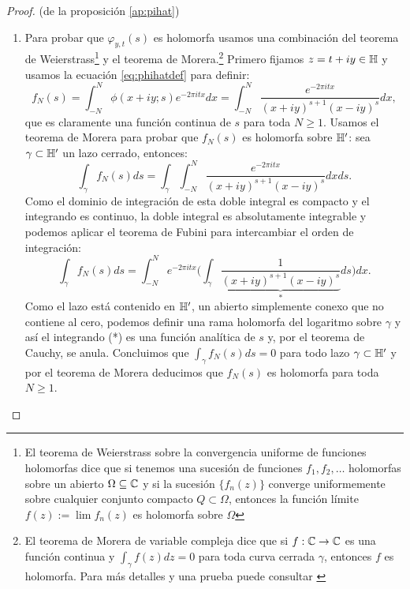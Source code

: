 \begin{proof}(de la proposici\'on \ref{ap:pihat})
\begin{enumerate}[label=\emph{\roman*})]
\item    
  Para probar que $\varphi_{y,t}(s)$ es holomorfa usamos una combinaci\'on del teorema de
  Weierstrass\footnote{El teorema de Weierstrass sobre la convergencia uniforme de funciones
    holomorfas dice que si tenemos una sucesi\'on de funciones $f_1,f_2,\ldots$ holomorfas sobre
    un abierto $\Omega\subseteq\mathbb{C}$ y si la sucesi\'on $\{f_n(z)\}$ converge uniformemente sobre
    cualquier conjunto compacto $Q\subset\Omega$, entonces la funci\'on l\'imite $f(z):=\lim f_n(z)$
    es holomorfa sobre $\Omega$} y el teorema de Morera.\footnote{
    El teorema de Morera de variable compleja dice que si $f:\mathbb{C}\rightarrow\mathbb{C}$ es una funci\'on continua
    y $\int_{\gamma}f(z)dz=0$ para toda curva cerrada $\gamma$, entonces $f$ es holomorfa. Para m\'as
    detalles y una prueba puede consultar \cite{AhlforsCA}}
  Primero fijamos $z=t+iy\in\mathbb{H}$ y usamos la ecuaci\'on \eqref{eq:phihatdef} para definir:
  \[
    f_N(s)=
    \int_{-N}^{N}\phi(x+iy;s)e^{-2\pi i tx}dx=
    \int_{-N}^{N}\frac{e^{-2\pi i tx}}{(x+iy)^{s+1}(x-iy)^s}dx,
  \]
  que es claramente una funci\'on continua de $s$ para toda $N\geq1$. Usamos el teorema de Morera para
  probar que $f_N(s)$ es holomorfa sobre $\mathbb{H}'$: sea $\gamma\subset\mathbb{H}'$ un lazo cerrado, entonces:
  \[
    \int_{\gamma}f_N(s)ds=\int_{\gamma}\int_{-N}^{N}\frac{e^{-2\pi i tx}}{(x+iy)^{s+1}(x-iy)^s}dxds.
  \]
  Como el dominio de integraci\'on de esta doble integral es compacto y el integrando es continuo,
  la doble integral es absolutamente integrable y podemos aplicar el teorema de Fubini para
  intercambiar el orden de integraci\'on:
  \[
    \int_{\gamma}f_N(s)ds=
    \int_{-N}^{N}e^{-2\pi i tx}
    \Big(\int_{\gamma}\underset{*}{\underbrace{\frac{1}{(x+iy)^{s+1}(x-iy)^s}}}ds\Big)dx.
  \]
  Como el lazo est\'a contenido en $\mathbb{H}'$, un abierto simplemente conexo que no contiene al cero,
  podemos definir una rama holomorfa del logaritmo sobre $\gamma$ y as\'i el integrando (*) es una
  funci\'on anal\'itica de $s$ y, por el teorema de Cauchy, se anula. Concluimos
  que $\int_{\gamma}f_N(s)ds=0$ para todo lazo $\gamma\subset\mathbb{H}'$ y por el teorema de Morera deducimos
  que $f_N(s)$ es holomorfa para toda $N\geq1$.


\end{enumerate}
\end{proof}
